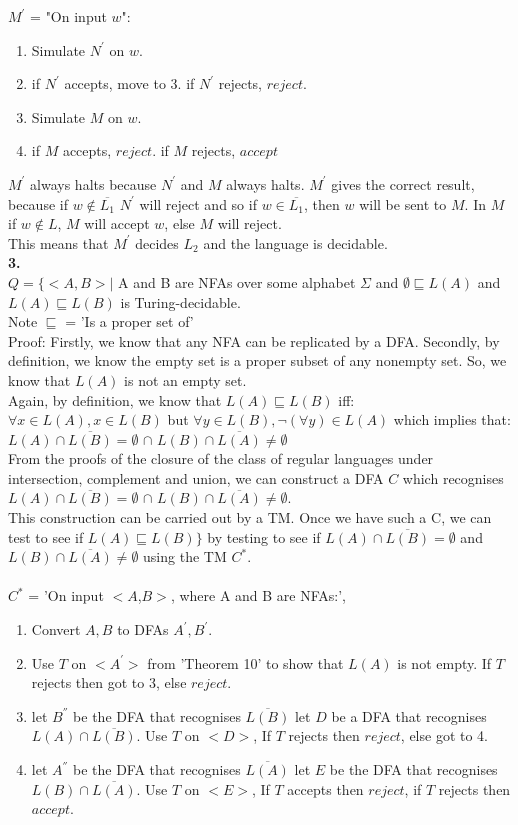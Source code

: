 \documentclass[a4paper,12pt]{article}
\begin{document}
$M^{'}$ = "On input $w$": 
\begin{enumerate}
\item Simulate $N^{'}$ on $w$.
\item if $N^{'}$ accepts, move to 3. if $N^{'}$ rejects, $reject$.
\item Simulate $M$ on $w$.
\item if $M$ accepts, $reject$. if $M$ rejects, $accept$
\end{enumerate}
$M^{'}$ always halts because $N^{'}$ and $M$ always halts. $M^{'}$ gives the correct result, because if $w \notin \overline{L_1}$ $N^{'}$ will reject and so if $w \in \overline{L_1}$, then $w$ will be sent to $M$. In $M$ if $w \notin L$, $M$ will accept $w$, else $M$ will reject. \\
This means that $M^{'}$ decides $L_2$ and the language is decidable. \\
\newpage
\textbf{3.} \\
$Q = \{ <A, B> |$ A and B are NFAs over some alphabet $\Sigma$ and $\emptyset \sqsubseteq L(A)$ and $L(A) \sqsubseteq L(B)$ is Turing-decidable. \\
Note $\sqsubseteq$ = 'Is a proper set of' \\
Proof: Firstly, we know that any NFA can be replicated by a DFA.
Secondly, by definition, we know the empty set is a proper subset of any nonempty set. So, we know that $L(A)$ is not an empty set. \\
Again, by definition, we know that $L(A) \sqsubseteq L(B)$ iff: \\
$\forall x \in L(A), x \in L(B)$ but $\forall y \in L(B), \neg(\forall y) \in L(A)$ which implies that: \\
$L(A) \cap \overline{L(B)} = \emptyset$ $\cap$ $L(B) \cap \overline{L(A)} \neq \emptyset$ 
\\
From the proofs of the closure of the class of regular languages under intersection, complement and union, we can construct a DFA $C$ which recognises 
$L(A) \cap \overline{L(B)} = \emptyset$ $\cap$ $L(B) \cap \overline{L(A)} \neq \emptyset$. \\
This construction can be carried out by a TM. Once we have such a C, we can test to see if $L(A) \sqsubseteq L(B)\}$ by testing to see if $L(A) \cap \overline{L(B)} = \emptyset$ and $L(B) \cap \overline{L(A)} \neq \emptyset$ using the TM $C^*$. \\
\\
$C^*$ = 'On input $<A$,$B>$, where A and B are NFAs:',
\begin{enumerate}
\item Convert $A,B$ to DFAs $A^{'},B^{'}$.
\item Use $T$ on $<A^{'}>$ from 'Theorem 10' to show that $L(A)$ is not empty. If $T$ rejects then got to 3, else $reject$. 
\item let $B^{''}$ be the DFA that recognises $\overline{L(B)}$ let $D$ be a DFA that recognises $L(A) \cap \overline{L(B)}$. Use $T$ on  $<D>$, If $T$ rejects then $reject$, else got to 4.  
\item let $A^{''}$ be the DFA that recognises $\overline{L(A)}$ let $E$ be the DFA that 
recognises $L(B) \cap \overline{L(A)}$. Use $T$ on $<E>$, If $T$ accepts then $reject$, if $T$ rejects then $accept$.
\end{enumerate}
\end{document}
